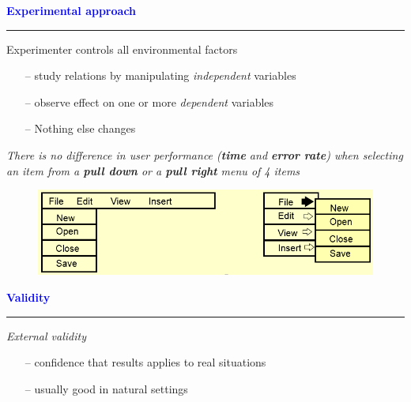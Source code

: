 \documentclass[pdf]{beamer}
\begin{document}
{%
{
\begin{frame}
    \textcolor{Blue}{\textbf{\Large{Experimental approach}}}
    \textcolor{red}{\rule{10cm}{1mm}}
    
   Experimenter controls all environmental factors\par
    \begin{itemize}
    \item[\textcolor{black}{--}] study relations by manipulating \textit{independent} variables

    \item[\textcolor{black}{--}] observe effect on one or more \textit{dependent} variables

    \item[\textcolor{black}{--}] Nothing else changes
    \end{itemize}
    
    \bigskip
    \bigskip
    
    \textit{There is no difference in user performance (\textbf{time} and \textbf{error rate}) when selecting an item from a \textbf{pull down} or a \textbf{pull right} menu of 4 items}
    \begin{figure}[b]
    	\includegraphics[scale = 0.4, center]{6_img.png}
    \end{figure}    
\end{frame}}



{
\begin{frame}
    \textcolor{Blue}{\textbf{\Large{Validity}}}
    \textcolor{red}{\rule{10cm}{1mm}}
    
   \textit{External validity}\par
    \begin{itemize}
    \item[\textcolor{black}{--}] confidence that results applies to real situations
    \item[\textcolor{black}{--}] usually good in natural settings
    \end{itemize}
    

\end{frame}}}
\end{document}

